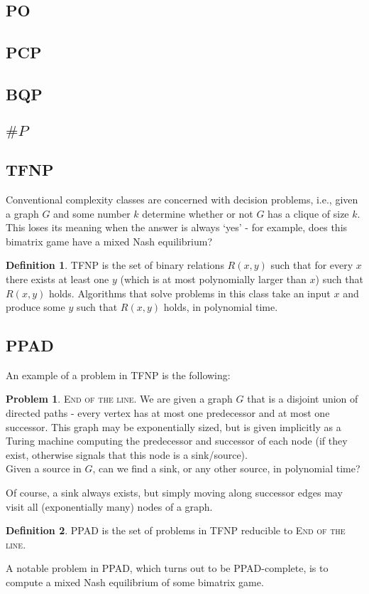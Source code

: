\documentclass[]{article}
\theoremstyle{definition}
\newtheorem{definition}{Definition}[section]
\newtheorem{problem}{Problem}[section]
\begin{document}
\subsection{PO}

\subsection{PCP}

\subsection{BQP}

\subsection{$\# P$}
\fi
\subsection{TFNP}
Conventional complexity classes are concerned with decision problems, i.e., given a graph $G$ and some number $k$ determine whether or not $G$ has a clique of size $k$.\\
This loses its meaning when the answer is always `yes' - for example, does this bimatrix game have a mixed Nash equilibrium?\\
\begin{definition}
	TFNP is the set of binary relations $R(x, y)$ such that for every $x$ there exists at least one $y$ (which is at most polynomially larger than $x$) such that $R(x,y)$ holds.
	Algorithms that solve problems in this class take an input $x$ and produce some $y$ such that $R(x, y)$ holds, in polynomial time.
\end{definition}

\subsection{PPAD}
An example of a problem in TFNP is the following:
\begin{problem}
	\textsc{End of the line.} We are given a graph $G$ that is a disjoint union of directed paths - every vertex has at most one predecessor and at most one successor. This graph may be exponentially sized,
	but is given implicitly as a Turing machine computing the predecessor and successor of each node (if they exist, otherwise signals that this node is a sink/source).\\
	Given a source in $G$, can we find a sink, or any other source, in polynomial time?
\end{problem}

Of course, a sink always exists, but simply moving along successor edges may visit all (exponentially many) nodes of a graph.

\begin{definition}
	PPAD is the set of problems in TFNP reducible to \textsc{End of the line.}
\end{definition}

A notable problem in PPAD, which turns out to be PPAD-complete, is to compute a mixed Nash equilibrium of some bimatrix game.
\end{document}
